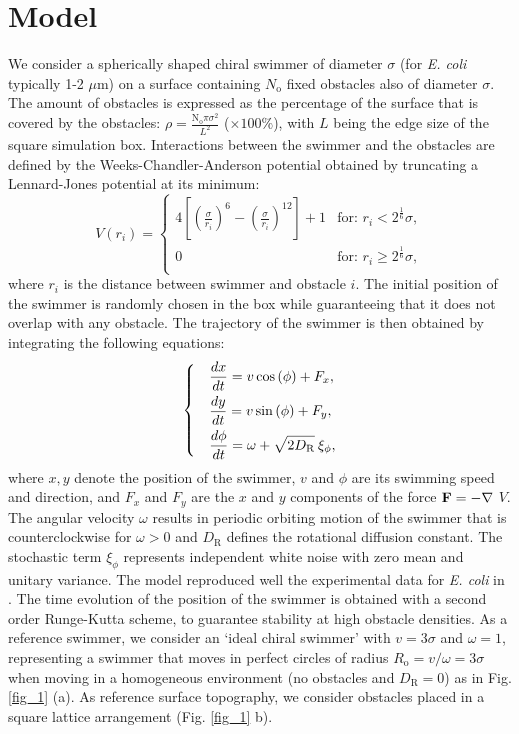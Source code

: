 \documentclass[aps,pre,twocolumn,showpacs,superscriptaddress,amsmath,amssymb,longbibliography]{revtex4-2}
\begin{document}
\section{Model}
We consider a spherically shaped chiral swimmer of diameter $\sigma$ (for \textit{E. coli} typically 1-2 $\mu$m) on a surface containing $N_{\textrm{o}}$ fixed obstacles also of diameter $\sigma$. The amount of obstacles is expressed as the percentage of the surface that is covered by the obstacles: $\rho = \frac {\mathrm{N_{\textrm{o}}} \pi \sigma^2}{L^2}$ ($\times 100 \%$), with $L$ being the edge size of the square simulation box. Interactions between the swimmer and the obstacles are defined by the Weeks-Chandler-Anderson potential obtained by truncating a Lennard-Jones potential at its minimum:
\begin{equation}
    V(r_{i}) =
    \begin{cases}
      4 \left[ \left( \frac{\sigma}{r_{i}} \right)^{6} - \left( \frac{\sigma}{r_{i}} \right)^{12} \right] + 1 & \text{for: $r_{i} < 2^{\frac{1}{6}} \sigma$},\\
      0 & \text{for: $r_{i} \geq 2^{\frac{1}{6}} \sigma$},\\
    \end{cases}       
\end{equation}
where $r_{i}$ is the distance between swimmer and obstacle $i$. 
The initial position of the swimmer is randomly chosen in the box while guaranteeing that it does not overlap with any obstacle. The trajectory of the swimmer is then obtained by integrating the following equations:
\begin{equation}\label{eqmotion}
    \begin{dcases}
    & \frac{{dx}}{d t} = v \cos{(\phi)} + F_x, \\
    & \frac{dy}{d t} = v \sin{(\phi)} + F_y, \\
    & \frac{d\phi}{d t} = \omega  + \sqrt{2D_{\textrm{R}}} \: \xi_{\phi},
    \end{dcases}
\end{equation}
where $x,y$ denote the position of the swimmer, $v$ and $\phi$ are its swimming speed and direction, and $F_x$ and $F_y$ are the $x$ and $y$ components of the force $\bf F = - \nabla$ $V$. The angular velocity $\omega$ results in periodic orbiting motion of the swimmer that is counterclockwise for $\omega > 0$ and $D_{\textrm{R}}$ defines the rotational diffusion constant. The stochastic term $\xi_{\phi}$ represents independent white noise with zero mean and unitary variance. The model reproduced well the experimental data for \textit{E. coli} in \cite{forward}. The time evolution of the position of the swimmer is obtained with a second order Runge-Kutta scheme, to guarantee stability at high obstacle densities. %
As a reference swimmer, we consider an `ideal chiral swimmer' with $v=3\sigma$ and $\omega=1$, representing a swimmer that moves in perfect circles of radius $R_{\textrm{o}} = v/\omega = 3\sigma$ when moving in a homogeneous environment (no obstacles and $D_{\textrm{R}}=0$) as in Fig. \ref{fig_1} (a). As reference surface topography, we consider obstacles placed in a square lattice arrangement (Fig. \ref{fig_1} b). 
\end{document}
